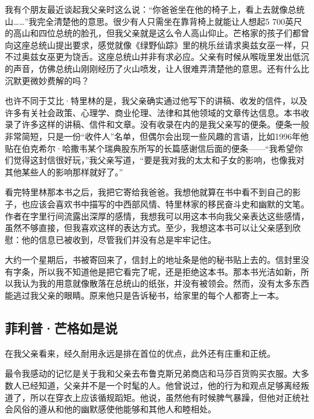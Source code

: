 我有个朋友最近谈起我父亲时这么说：“你爸爸坐在他的椅子上，看上去就像总统山……”我完全清楚他的意思。很少有人只需坐在靠背椅上就能让人想起5 700英尺的高山和四位总统的脸孔，但我父亲就是这么令人高山仰止。芒格家的孩子们都曾向这座总统山提出要求，感觉就像《绿野仙踪》里的桃乐丝请求奥兹女巫一样，只不过奥兹女巫更为饶舌。这座总统山并非有求必应。父亲有时候从喉咙里发出低沉的声音，仿佛总统山刚刚经历了火山喷发，让人很难弄清楚他的意思。还有什么比沉默更微妙费解的吗？
\par

也许不同于艾比·特里林的是，我父亲确实通过他写下的讲稿、收发的信件，以及许多有关社会政策、心理学、商业伦理、法律和其他领域的文章传达信息。本书收录了许多这样的讲稿、信件和文章。没有收录在内的是我父亲写的便条。便条一般非常简短，只是一份“收件人”名单，但偶尔会出现一些风趣的言语，比如1996年他贴在伯克希尔·哈撒韦某个瑞典股东所写的长篇感谢信后面的便条——“我希望你们觉得这封信很好玩，”我父亲写道，“要是我对我的太太和子女的影响，也像我对其他某些人的影响那样就好了。”
\par

看完特里林那本书之后，我把它寄给我爸爸。我想他就算在书中看不到自己的影子，也应该会喜欢书中描写的中西部风情、特里林家的移民奋斗史和幽默的文笔。作者在字里行间流露出深厚的感情，我想我可以用这本书向我父亲表达这些感情，虽然不够直接，但我喜欢这样的表达方式。至少，我想这本书可以让父亲感到欣慰：他的信息已被收到，尽管我们并没有总是牢牢记住。
\par

大约一个星期后，书被寄回来了，信封上的地址条是他的秘书贴上去的。信封里没有字条，所以我不知道他是把它看完了呢，还是拒绝这本书。那本书光洁如新，所以我认为我的用意就像散落在总统山的纸张，并没有被领会。然而，没有太多东西能逃过我父亲的眼睛。原来他只是告诉秘书，给家里的每个人都寄上一本。
\par

\subsection*{菲利普·芒格如是说}

\begin{WisdomBox}
\par

在我父亲看来，经久耐用永远是排在首位的优点，此外还有庄重和正统。
\par
\end{WisdomBox}

最令我感动的记忆是关于我和父亲去布鲁克斯兄弟商店和马莎百货购买衣服。大多数人已经知道，父亲并不是一个时髦的人。他曾说过，他的行为和观点足够离经叛道了，所以在穿衣上应该循规蹈矩。他说，虽然他有时候脾气暴躁，但他对正统社会风俗的遵从和他的幽默感使他能够和其他人和睦相处。
\par

